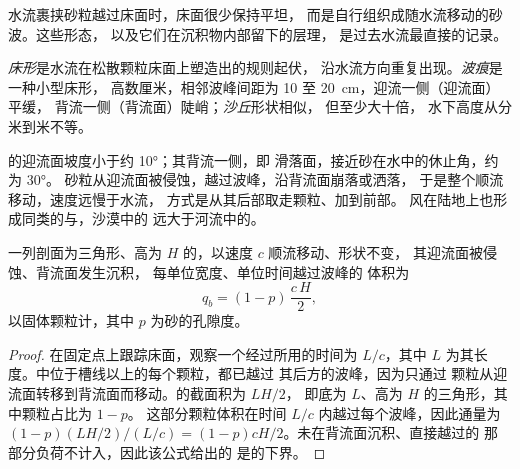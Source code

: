 水流裹挟砂粒越过床面时，床面很少保持平坦，
而是自行组织成随水流移动的砂波。这些形态，
以及它们在沉积物内部留下的层理，
是过去水流最直接的记录。

\begin{definition}[床形，波痕，沙丘]\label{def:b1:clastic-sediments:bedform}
\emph{床形}是水流在松散颗粒床面上塑造出的规则起伏，
沿水流方向重复出现。\emph{波痕}是一种小型床形，
高数厘米，相邻波峰间距为 10 至 \qty{20}{cm}，迎流一侧（迎流面）平缓，
背流一侧（背流面）陡峭；\emph{沙丘}形状相似，
但至少大十倍，
水下高度从分米到米不等。
\end{definition}

的迎流面坡度小于约 \ang{10}；其背流一侧，即
滑落面，接近砂在水中的休止角，约为 \ang{30}。
砂粒从迎流面被侵蚀，越过波峰，沿背流面崩落或洒落，
于是整个顺流移动，速度远慢于水流，
方式是从其后部取走颗粒、加到前部。
风在陆地上也形成同类的与，沙漠中的
远大于河流中的。

\begin{proposition}[床形迁移与推移质]\label{prop:b1:clastic-sediments:migration}
一列剖面为三角形、高为 $H$ 的，以速度 $c$ 顺流移动、形状不变，
其迎流面被侵蚀、背流面发生沉积，
每单位宽度、单位时间越过波峰的
体积为
\[
  q_b = (1 - p)\,\frac{c\,H}{2},
\]
以固体颗粒计，其中 $p$ 为砂的孔隙度。
\end{proposition}

\begin{proof}
在固定点上跟踪床面，观察一个经过所用的时间为 $L/c$，其中 $L$
为其长度。中位于槽线以上的每个颗粒，都已越过
其后方的波峰，因为只通过
颗粒从迎流面转移到背流面而移动。的截面积为 $LH/2$，
即底为 $L$、高为 $H$ 的三角形，其中颗粒占比为 $1 - p$。
这部分颗粒体积在时间 $L/c$ 内越过每个波峰，因此通量为
$(1-p)(LH/2)/(L/c) = (1-p)cH/2$。未在背流面沉积、直接越过的
那部分负荷不计入，因此该公式给出的
是的下界。
\end{proof}

